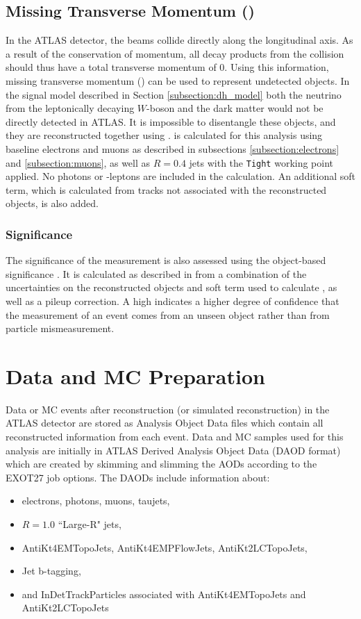 \subsection{Missing Transverse Momentum (\met)}
In the ATLAS detector, the beams collide directly along the longitudinal axis. As a result of the conservation of momentum, all decay products from the collision should thus have a total transverse momentum of 0. Using this information, missing transverse momentum (\met) can be used to represent undetected objects. In the signal model described in Section \ref{subsection:dh_model} both the neutrino from the leptonically decaying $W$-boson and the dark matter would not be directly detected in ATLAS. It is impossible to disentangle these objects, and they are reconstructed together using \met. \met is calculated for this analysis using baseline electrons and muons as described in subsections \ref{subsection:electrons} and \ref{subsection:muons}, as well as $R=0.4$ jets with the \verb|Tight| working point applied. No photons or \tau-leptons are included in the calculation. An additional soft term, which is calculated from tracks not associated with the reconstructed objects, is also added.

\subsubsection{\met Significance}
The significance of the \met measurement is also assessed using the object-based \met significance \metsig. It is calculated as described in \cite{MetSig} from a combination of the uncertainties on the reconstructed objects and soft term used to calculate \met, as well as a pileup correction. A high \metsig indicates a higher degree of confidence that the \met measurement of an event comes from an unseen object rather than from particle mismeasurement.

\section{Data and MC Preparation}
Data or MC events after reconstruction (or simulated reconstruction) in the ATLAS detector are stored as Analysis Object Data files which contain all reconstructed information from each event. Data and MC samples used for this analysis are initially in ATLAS Derived Analysis Object Data (DAOD format) which are created by skimming and slimming the AODs according to the EXOT27 job options. The DAODs include information about:
\begin{itemize}
	\item electrons, photons, muons, taujets,
	\item $R=1.0$ ``Large-R" jets,
	\item AntiKt4EMTopoJets, AntiKt4EMPFlowJets, AntiKt2LCTopoJets,
  \item Jet b-tagging,
	\item and InDetTrackParticles associated with AntiKt4EMTopoJets and AntiKt2LCTopoJets
\end{itemize}

